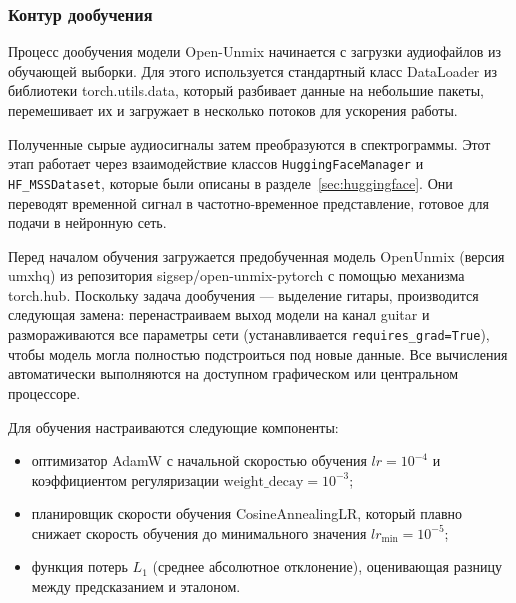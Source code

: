 \documentclass[14pt]{extarticle}
\begin{document}
\subsubsection{Контур дообучения}
Процесс дообучения модели Open-Unmix начинается с загрузки аудиофайлов из обучающей выборки. 
Для этого используется стандартный класс DataLoader из библиотеки torch.utils.data, который разбивает данные на небольшие 
пакеты, перемешивает их и загружает в несколько потоков для ускорения работы.

Полученные сырые аудиосигналы затем преобразуются в спектрограммы.
Этот этап работает через взаимодействие классов \texttt{HuggingFaceManager} и \texttt{HF\_MSSDataset},
которые были описаны в разделе~\ref{sec:huggingface}.
Они переводят временной сигнал в частотно-временное представление, готовое для подачи в нейронную сеть.

Перед началом обучения загружается предобученная модель OpenUnmix (версия umxhq) из репозитория 
sigsep/open-unmix-pytorch с помощью механизма torch.hub. 
Поскольку задача дообучения --- выделение гитары, производится следующая замена: перенастраиваем выход модели на 
канал guitar и размораживаются все параметры сети (устанавливается \texttt{requires\_grad=True}), 
чтобы модель могла полностью подстроиться под новые данные. 
Все вычисления автоматически выполняются на доступном графическом или центральном процессоре.

Для обучения настраиваются следующие компоненты:
\begin{itemize}[label=$\bullet$, wide]
	\item оптимизатор AdamW с начальной скоростью обучения $lr = 10^{-4}$ и коэффициентом регуляризации $\text{weight\_decay} = 10^{-3}$;
    \item планировщик скорости обучения CosineAnnealingLR, который плавно снижает скорость обучения до минимального значения $lr_{\min} = 10^{-5}$;
    \item функция потерь $L_1$ (среднее абсолютное отклонение), оценивающая разницу между предсказанием и эталоном.
\end{itemize}
\end{document}
